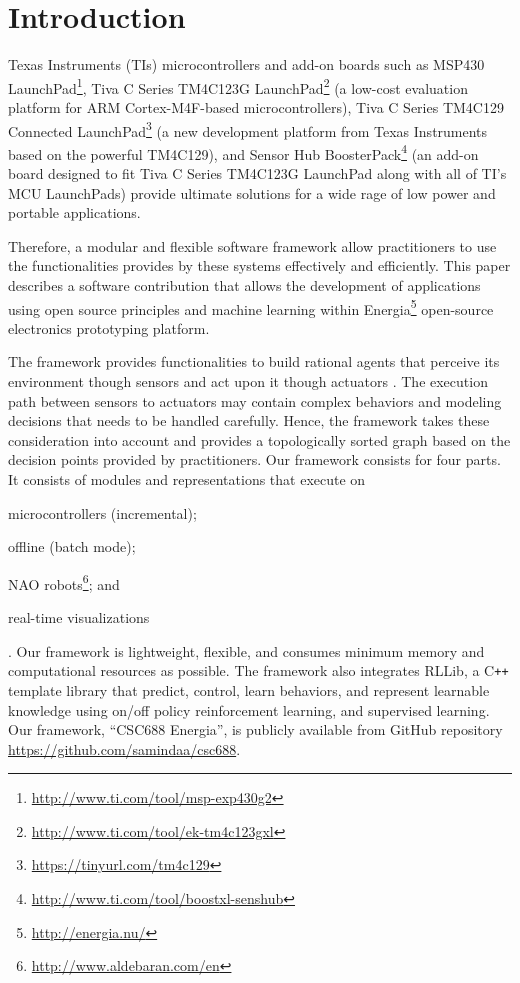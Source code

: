 \documentclass[letterpaper]{article}
\begin{document}
\section{Introduction}

Texas Instruments (TIs) microcontrollers and add-on boards such as MSP430{\texttrademark}
LaunchPad\footnote{\url{http://www.ti.com/tool/msp-exp430g2}},
Tiva{\texttrademark} C Series TM4C123G
LaunchPad\footnote{\url{http://www.ti.com/tool/ek-tm4c123gxl}} (a low-cost evaluation platform for
ARM
Cortex-M4F-based microcontrollers), Tiva C Series TM4C129 Connected
LaunchPad\footnote{\url{https://tinyurl.com/tm4c129}} (a new
development platform from Texas Instruments
based on the powerful TM4C129), and Sensor
Hub BoosterPack\footnote{\url{http://www.ti.com/tool/boostxl-senshub}} (an add-on board designed to
fit Tiva C Series TM4C123G LaunchPad
along with all of TI’s MCU LaunchPads) provide ultimate solutions
for a wide rage of low power and portable applications.

Therefore, a modular and flexible software
framework allow practitioners to use the functionalities provides by these systems effectively
and efficiently. This paper describes a software contribution that allows the development of
applications using open source principles and machine learning within
Energia\footnote{\url{http://energia.nu/}} open-source electronics prototyping platform.

The framework provides functionalities to build  rational agents that perceive its
environment though sensors and act upon it though actuators \cite{russel2009}. The execution path
between sensors to actuators may contain complex behaviors and modeling decisions that needs to be
handled carefully. Hence, the framework takes these consideration into account and provides a
topologically sorted graph based on the decision points provided by practitioners. Our
framework consists for four parts. It consists of modules and representations that execute on
\begin{inparaenum}[(1)]\item microcontrollers (incremental); \item offline (batch mode); \item NAO
robots\footnote{\url{http://www.aldebaran.com/en}}; and \item real-time
visualizations\end{inparaenum}. Our framework is lightweight, flexible, and consumes minimum memory
and computational resources as
possible. The framework also integrates RLLib, a C\texttt{++} template library that predict,
control, learn behaviors, and represent learnable knowledge using on/off policy reinforcement
learning, and supervised learning. Our framework, ``CSC688 Energia'', is publicly available from
GitHub repository \url{https://github.com/samindaa/csc688}.
\end{document}
